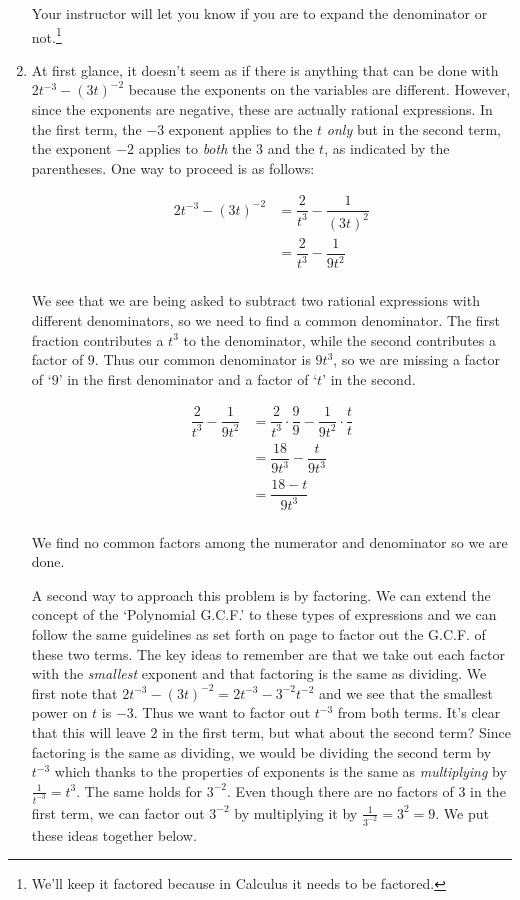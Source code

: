 \begin{ex}
\begin{enumerate}
Your instructor will let you know if you are to expand the denominator or not.\footnote{We'll keep it factored because in Calculus it needs to be factored.}

\item  At first glance, it doesn't seem as if there is anything that can be done with $2t^{-3} - (3t)^{-2}$ because the exponents on the variables are different.  However, since the exponents are negative, these are actually rational expressions.  In the first term, the $-3$ exponent applies to the $t$ \textit{only} but in the second term, the exponent $-2$ applies to \textit{both} the $3$ and the $t$, as indicated by the parentheses.  One way to proceed is as follows:

\begin{align*}
2t^{-3} - (3t)^{-2} & = \dfrac{2}{t^3} - \dfrac{1}{(3t)^2} \\ 
& = \dfrac{2}{t^3} - \dfrac{1}{9t^2} \\
\end{align*}
										
We see that we are being asked to subtract two rational expressions with different denominators, so we need to find a common denominator.  The first fraction contributes a $t^3$ to the denominator, while the second contributes a factor of $9$.  Thus our common denominator is $9t^3$, so we are missing a factor of `$9$' in the first denominator and a factor of `$t$' in the second.

\begin{align*}
\dfrac{2}{t^3} - \dfrac{1}{9t^2} & =  \dfrac{2}{t^3} \cdot \dfrac{9}{9} - \dfrac{1}{9t^2} \cdot \dfrac{t}{t} \tag{Equivalent Fractions} \\ 
& =  \dfrac{18}{9t^3} - \dfrac{t}{9t^3} \tag{Multiply}\\ 
& = \dfrac{18 - t}{9t^3} \tag{Subtract} \\
\end{align*}

We find no common factors among the numerator and denominator so we are done.  

A second way to approach this problem is by factoring.  We can extend the concept of the `Polynomial G.C.F.' to these types of expressions and we can follow the same guidelines as set forth on page \pageref{PolynomialGCF} to factor out the G.C.F. of these two terms.  The key ideas to remember are that we take out each factor with the \textit{smallest} exponent and that factoring is the same as dividing.  We first note that $2t^{-3} - (3t)^{-2}=  2t^{-3} - 3^{-2} t^{-2}$ and we see that the smallest power on $t$ is $-3$. Thus we want to factor out $t^{-3}$ from both terms.  It's clear that this will leave $2$ in the first term, but what about the second term?  Since factoring is the same as dividing, we would be dividing the second term by $t^{-3}$ which thanks to the properties of exponents is the same as \textit{multiplying} by $\frac{1}{t^{-3}} = t^3$.  The same holds for $3^{-2}$.  Even though there are no factors of $3$ in the first term, we can factor out $3^{-2}$ by multiplying it by $\frac{1}{3^{-2}} = 3^2 = 9$. We put these ideas together below.


\end{enumerate}
\end{ex}

